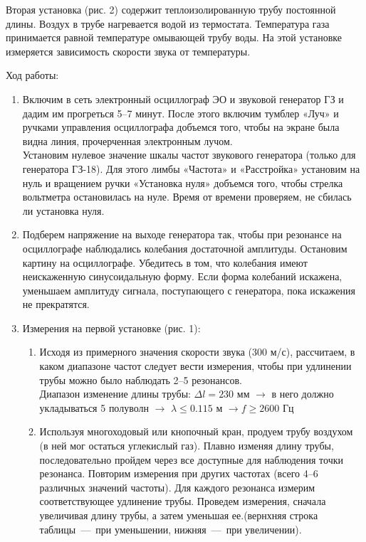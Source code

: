 \documentclass[12pt,a4paper]{article}
\begin{document}
	Вторая установка (рис. 2) содержит теплоизолированную трубу постоянной длины. Воздух в трубе нагревается водой из термостата. Температура газа принимается равной температуре омывающей трубу воды. На этой установке измеряется зависимость скорости звука от температуры.\\
	
	\begin{center}
		Ход работы:
	\end{center}
	
	\begin{enumerate}
		\item Включим в сеть электронный осциллограф ЭО и звуковой генератор ГЗ и дадим им прогреться 5–7 минут. После этого включим тумблер «Луч» и ручками управления осциллографа добъемся того, чтобы на экране была видна линия, прочерченная электронным лучом.\\
		
	Установим нулевое значение шкалы частот звукового генератора (только для генератора ГЗ-18). Для этого лимбы «Частота» и «Расстройка» установим на нуль и вращением ручки «Установка нуля» добъемся того, чтобы стрелка вольтметра остановилась на нуле. Время от времени проверяем, не сбилась ли установка нуля.
	
	\item Подберем напряжение на выходе генератора так, чтобы при резонансе на осциллографе наблюдались колебания достаточной амплитуды. Остановим картину на осциллографе. Убедитесь в том, что колебания имеют неискаженную синусоидальную форму. Если форма колебаний искажена, уменьшаем амплитуду сигнала, поступающего с генератора, пока искажения не прекратятся.
	
	\item Измерения на первой установке (рис. 1):
	
		\begin{enumerate}
			\item Исходя из примерного значения скорости звука (300 м/с), рассчитаем, в каком диапазоне частот следует вести измерения, чтобы при удлинении трубы можно было наблюдать 2–5 резонансов.\\
			
			Диапазон изменение длины трубы: $\Delta l = 230$ мм $\rightarrow$ в него должно укладываться 5 полуволн $\rightarrow$ $\lambda \leqslant 0.115$ м $\rightarrow f \geqslant 2600$ Гц
			\item Используя многоходовый или кнопочный кран, продуем трубу воздухом (в ней мог остаться углекислый газ). Плавно изменяя длину трубы, последовательно пройдем через все доступные для наблюдения точки резонанса. Повторим измерения при других частотах (всего 4–6 различных значений частоты). Для каждого резонанса измерим соответствующее удлинение трубы. Проведем измерения, сначала увеличивая длину трубы, а затем уменьшая ее.(вернхняя строка таблицы~---~при уменьшении, нижняя~---~при увеличении).\\
			

\end{enumerate}
\end{enumerate}
\end{document}
